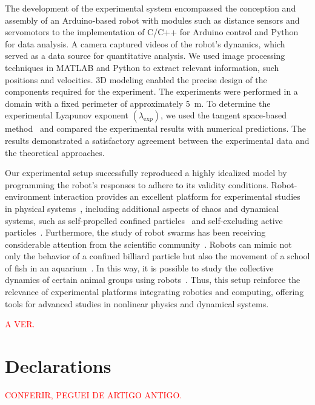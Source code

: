 \documentclass[pdflatex,sn-mathphys-num,iicol]{sn-jnl}%
\newcommand{\red}[1]{\textcolor{red}{#1}}
\theoremstyle{thmstyleone}%
\theoremstyle{thmstyletwo}%
\theoremstyle{thmstylethree}%
\begin{document}
The development of the experimental system encompassed the conception and assembly of an Arduino-based robot with modules such as distance sensors and servomotors to the implementation of C/C++ for Arduino control and Python for data analysis. A camera captured videos of the robot's dynamics, which served as a data source for quantitative analysis. We used image processing techniques in MATLAB and Python to extract relevant information, such positions and velocities. 3D modeling enabled the precise design of the components required for the experiment. The experiments were performed in a domain with a fixed perimeter of approximately 5~m. To determine the experimental Lyapunov exponent $(\lambda_\text{exp})$, we used the tangent space-based method~\cite{ben:1978,pik:2016,vas:2022,qui:2025} and compared the experimental results with numerical predictions. The results demonstrated a satisfactory agreement between the experimental data and the theoretical approaches.

Our experimental setup successfully reproduced a highly idealized model by programming the robot's responses to adhere to its validity conditions. Robot-environment interaction provides an excellent platform for experimental studies in physical systems~\cite{sch:1998,dau:2019,leo:2020,li:2022,li:2023,gol:2024,par:2024}, including additional aspects of chaos and dynamical systems, such as self-propelled confined particles~\cite{dam:2022} and self-excluding active particles~\cite{alb:2024}. Furthermore, the study of robot swarms has been receiving considerable attention from the scientific community~\cite{gar:2018}. Robots can mimic not only the behavior of a confined billiard particle but also the movement of a school of fish in an aquarium~\cite{lea:2024,rom:2024,deSou:2024}. In this way, it is possible to study the collective dynamics of certain animal groups using robots~\cite{lei:2020}. Thus, this setup reinforce the relevance of experimental platforms integrating robotics and computing, offering tools for advanced studies in nonlinear physics and dynamical systems.


\red{A VER.}

\section*{Declarations}

\red{CONFERIR, PEGUEI DE ARTIGO ANTIGO.}
\end{document}
